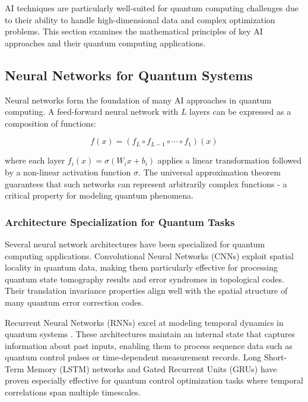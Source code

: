 AI techniques are particularly well-suited for quantum computing challenges due to their ability to handle high-dimensional data and complex optimization problems. This section examines the mathematical principles of key AI approaches and their quantum computing applications.

\subsection{Neural Networks for Quantum Systems}

Neural networks form the foundation of many AI approaches in quantum computing. A feed-forward neural network with $L$ layers can be expressed as a composition of functions:

\begin{equation}
f(x) = (f_L \circ f_{L-1} \circ \cdots \circ f_1)(x)
\end{equation}

where each layer $f_i(x) = \sigma(W_i x + b_i)$ applies a linear transformation followed by a non-linear activation function $\sigma$. The universal approximation theorem \cite{hornik1989multilayer} guarantees that such networks can represent arbitrarily complex functions - a critical property for modeling quantum phenomena.

\subsubsection{Architecture Specialization for Quantum Tasks}

Several neural network architectures have been specialized for quantum computing applications. Convolutional Neural Networks (CNNs) exploit spatial locality in quantum data, making them particularly effective for processing quantum state tomography results and error syndromes in topological codes. Their translation invariance properties align well with the spatial structure of many quantum error correction codes.

Recurrent Neural Networks (RNNs) excel at modeling temporal dynamics in quantum systems \cite{banchi2018modelling}. These architectures maintain an internal state that captures information about past inputs, enabling them to process sequence data such as quantum control pulses or time-dependent measurement records. Long Short-Term Memory (LSTM) networks and Gated Recurrent Units (GRUs) have proven especially effective for quantum control optimization tasks where temporal correlations span multiple timescales.

